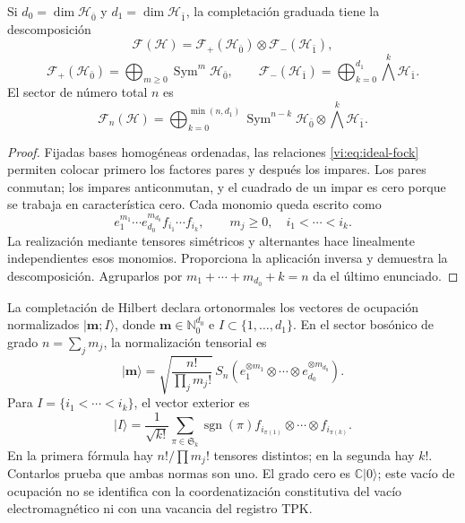 \begin{theorem}
\label{vi:thm:fock-graduado}
Si \(d_0=\dim\mathcal H_{\bar0}\) y
\(d_1=\dim\mathcal H_{\bar1}\), la completación graduada tiene
la descomposición
\begin{equation}
 \mathcal F(\mathcal H)=
 \mathcal F_+(\mathcal H_{\bar0})\otimes
 \mathcal F_-(\mathcal H_{\bar1}),
 \label{vi:eq:fock-producto}
\end{equation}
\[
 \mathcal F_+(\mathcal H_{\bar0})=
 \bigoplus_{m\ge0}\operatorname{Sym}^m\mathcal H_{\bar0},
 \qquad
 \mathcal F_-(\mathcal H_{\bar1})=
 \bigoplus_{k=0}^{d_1}\bigwedge^k\mathcal H_{\bar1}.
\]
El sector de número total \(n\) es
\[
 \mathcal F_n(\mathcal H)=
 \bigoplus_{k=0}^{\min(n,d_1)}
 \operatorname{Sym}^{n-k}\mathcal H_{\bar0}
 \otimes\bigwedge^k\mathcal H_{\bar1}.
\]
\end{theorem}
\begin{proof}
Fijadas bases homogéneas ordenadas, las relaciones
\eqref{vi:eq:ideal-fock} permiten colocar primero los factores pares
y después los impares. Los pares conmutan; los impares anticonmutan,
y el cuadrado de un impar es cero porque se trabaja en característica
cero. Cada monomio queda escrito como
\[
 e_1^{m_1}\cdots e_{d_0}^{m_{d_0}}
 f_{i_1}\cdots f_{i_k},
 \qquad m_j\ge0,\quad i_1<\cdots<i_k.
\]
La realización mediante tensores simétricos y alternantes hace
linealmente independientes esos monomios. Proporciona la aplicación
inversa y demuestra la descomposición. Agruparlos por
\(m_1+\cdots+m_{d_0}+k=n\) da el último enunciado.
\end{proof}

La completación de Hilbert declara ortonormales los vectores de
ocupación normalizados \(|\boldsymbol m;I\rangle\), donde
\(\boldsymbol m\in\mathbb N_0^{d_0}\) e
\(I\subset\{1,\ldots,d_1\}\). En el sector bosónico de grado
\(n=\sum_jm_j\), la normalización tensorial es
\[
 |\boldsymbol m\rangle=
 \sqrt{\frac{n!}{\prod_jm_j!}}\,
 S_n(e_1^{\otimes m_1}\otimes\cdots\otimes
 e_{d_0}^{\otimes m_{d_0}}).
\]
Para \(I=\{i_1<\cdots<i_k\}\), el vector exterior es
\[
 |I\rangle=\frac1{\sqrt{k!}}\sum_{\pi\in\mathfrak S_k}
 \operatorname{sgn}(\pi)
 f_{i_{\pi(1)}}\otimes\cdots\otimes f_{i_{\pi(k)}}.
\]
En la primera fórmula hay \(n!/\prod m_j!\) tensores distintos;
en la segunda hay \(k!\). Contarlos prueba que ambas normas son uno.
El grado cero es \(\mathbb C|0\rangle\); este vacío de ocupación
no se identifica con la coordenatización constitutiva del vacío electromagnético
ni con una vacancia del registro TPK.

